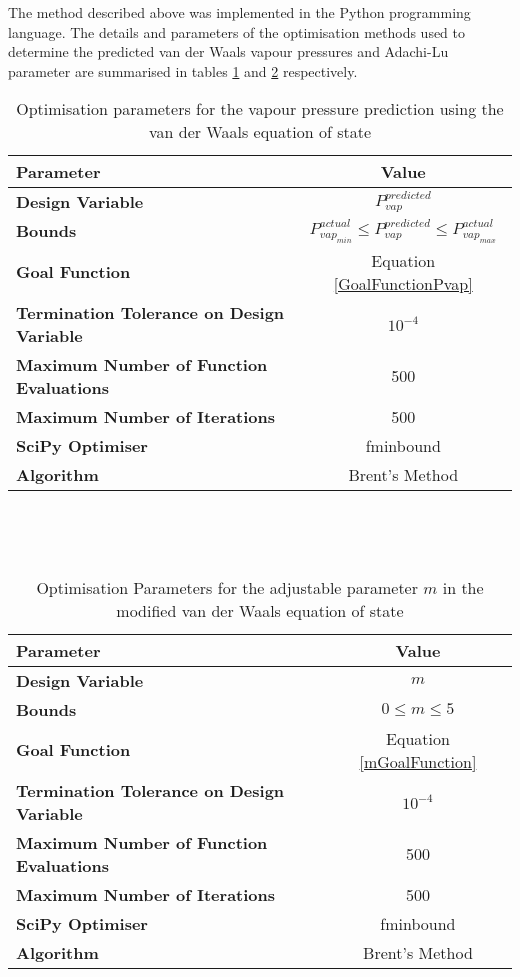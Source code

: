 The method described above was implemented in the Python programming language. The details and parameters of the optimisation methods used to determine the predicted van der Waals vapour pressures and Adachi-Lu parameter are summarised in tables \ref{PvapOptParam} and \ref{mOptParam} respectively.\\

\begin{table}[h]
\caption{Optimisation parameters for the vapour pressure prediction using the van der Waals equation of state }
\centering
\begin{tabular}{lc}
\toprule
\textbf{Parameter}&\textbf{Value}\\
\midrule
\textbf{Design Variable}& $P_{vap}^{predicted}$\\
\textbf{Bounds}& $P_{vap_{min}}^{actual} \leq P_{vap}^{predicted} \leq P_{vap_{max}}^{actual}$\\
\textbf{Goal Function}& Equation \ref{GoalFunctionPvap} \\
\textbf{Termination Tolerance on Design Variable}& $10^{-4}$\\
\textbf{Maximum Number of Function Evaluations}&500\\
\textbf{Maximum Number of Iterations}&500\\				
\textbf{SciPy Optimiser }&fminbound\\
\textbf{Algorithm}& Brent's Method\\
\bottomrule
\end{tabular}\\
\label{PvapOptParam}
\end{table}\

\begin{table}[h]
\caption{Optimisation Parameters for the adjustable parameter $m$ in the modified van der Waals equation of state}
\centering
\begin{tabular}{lc}
\toprule
\textbf{Parameter}&\textbf{Value}\\
\midrule
\textbf{Design Variable}& $m$\\
\textbf{Bounds}&$ 0 \leq m \leq 5$\\
\textbf{Goal Function}&Equation \ref{mGoalFunction} \\
\textbf{Termination Tolerance on Design Variable}&$10^{-4}$\\
\textbf{Maximum Number of Function Evaluations}&500\\
\textbf{Maximum Number of Iterations}&500\\				
\textbf{SciPy Optimiser }&fminbound\\
\textbf{Algorithm}& Brent's Method\\
\bottomrule
\end{tabular}\\
\label{mOptParam}			
\end{table}\
					
